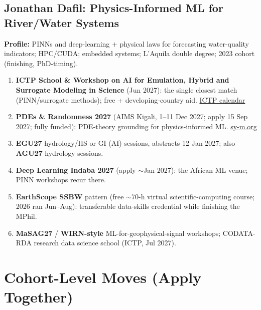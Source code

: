 \documentclass[11pt,a4paper]{article}
\begin{document}
\subsection{Jonathan Dafil: Physics-Informed ML for River/Water Systems}
\textbf{Profile:} PINNs and deep-learning $+$ physical laws for forecasting water-quality indicators; HPC/CUDA; embedded systems; L'Aquila double degree; 2023 cohort (finishing, PhD-timing).
\begin{enumerate}[leftmargin=1.6em]
  \item \textbf{ICTP School \& Workshop on AI for Emulation, Hybrid and Surrogate Modeling in Science} (Jun 2027): the single closest match (PINN/surrogate methods); free + developing-country aid. \href{https://www.ictp.it/home/scientific-calendar}{ICTP calendar}
  \item \textbf{PDEs \& Randomness 2027} (AIMS Kigali, 1--11 Dec 2027; apply 15 Sep 2027; fully funded): PDE-theory grounding for physics-informed ML. \href{https://sy-m.org/pdes-and-randomness.html}{sy-m.org}
  \item \textbf{EGU27} hydrology/HS or GI (AI) sessions, abstracts 12 Jan 2027; also \textbf{AGU27} hydrology sessions.
  \item \textbf{Deep Learning Indaba 2027} (apply $\sim$Jan 2027): the African ML venue; PINN workshops recur there.
  \item \textbf{EarthScope SSBW} pattern (free $\sim$70-h virtual scientific-computing course; 2026 ran Jun--Aug): transferable data-skills credential while finishing the MPhil.
  \item \textbf{MaSAG27} / \textbf{WIRN-style} ML-for-geophysical-signal workshops; CODATA-RDA research data science school (ICTP, Jul 2027).
\end{enumerate}

\section{Cohort-Level Moves (Apply Together)}
\end{document}
